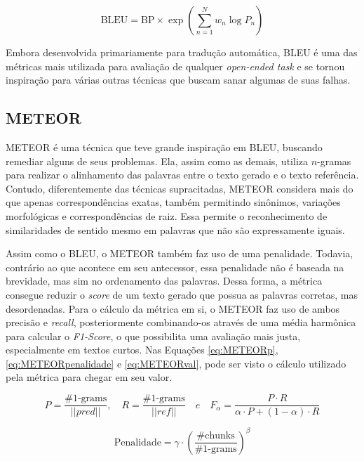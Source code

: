 \documentclass[cic,tc]{iiufrgs}
\begin{document}
\begin{equation}
    \label{eq:BLEUval}
    \text{BLEU} = \text{BP} \times \exp\left( \sum_{n=1}^N w_n \log P_n \right)
\end{equation}

Embora desenvolvida primariamente para tradução automática, BLEU é uma das métricas mais utilizada para avaliação de qualquer \textit{open-ended task} e se tornou inspiração para várias outras técnicas que buscam sanar algumas de suas falhas.

\subsection{METEOR}
METEOR \cite{banerjee2005meteor} é uma técnica que teve grande inspiração em BLEU, buscando remediar alguns de seus problemas. Ela, assim como as demais, utiliza $n$-gramas para realizar o alinhamento das palavras entre o texto gerado e o texto referência. Contudo, diferentemente das técnicas supracitadas, METEOR considera mais do que apenas correspondências exatas, também permitindo sinônimos, variações morfológicas e correspondências de raiz. Essa permite o reconhecimento de similaridades de sentido mesmo em palavras que não são expressamente iguais.


Assim como o BLEU, o METEOR também faz uso de uma penalidade. Todavia, contrário ao que acontece em seu antecessor, essa penalidade não é baseada na brevidade, mas sim no ordenamento das palavras. Dessa forma, a métrica consegue reduzir o \textit{score} de um texto gerado que possua as palavras corretas, mas desordenadas. Para o cálculo da métrica em si, o METEOR faz uso de ambos precisão e \textit{recall}, posteriormente combinando-os através de uma média harmônica para calcular o \textit{F1-Score}, o que possibilita uma avaliação mais justa, especialmente em textos curtos. Nas Equações \ref{eq:METEORp}, \ref{eq:METEORpenalidade} e \ref{eq:METEORval}, pode ser visto o cálculo utilizado pela métrica para chegar em seu valor.

\begin{equation}
    \label{eq:METEORp}
    P = \frac{\text{\#1-grams}}{||pred||}, \quad R = \frac{\text{\#1-grams}}{||ref||} \quad e \quad F_{\alpha} = \frac{P \cdot R}{\alpha \cdot P + (1 - \alpha) \cdot R}
\end{equation}

\begin{equation}
    \label{eq:METEORpenalidade}
    \text{Penalidade} = \gamma \cdot \left(\frac{\text{\#chunks}}{\text{\#1-grams}}\right)^{\beta}
\end{equation}
\end{document}
